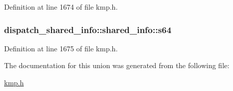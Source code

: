 Definition at line 1674 of file kmp.\-h.

\hypertarget{uniondispatch__shared__info_1_1shared__info_a7fdd3cf5a93b568ae520fba0b416e103}{
\subsubsection[{s64}]{ dispatch\-\_\-shared\-\_\-info\-::shared\-\_\-info\-::s64}}\label{uniondispatch__shared__info_1_1shared__info_a7fdd3cf5a93b568ae520fba0b416e103}


Definition at line 1675 of file kmp.\-h.



The documentation for this union was generated from the following file\-:\begin{DoxyCompactItemize}
\item 
\hyperlink{kmp_8h}{kmp.\-h}\end{DoxyCompactItemize}
